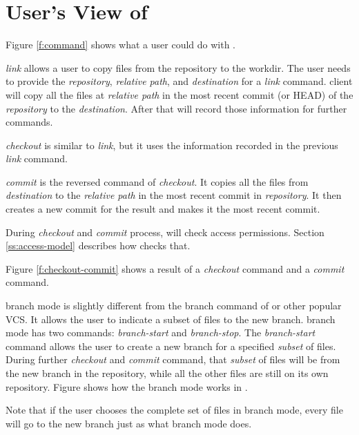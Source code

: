 \section{User's View of \Sys}
\label{userview}

\iffalse
    * Describe what action a user could make. Write a table for all the actions.
    * Describe the functionality for each important action which can not be
      described completely in the table.
    * Mention how each action is related to the FVM Daemon, if needed. (probably
      not needed)
\fi



Figure \ref{f:command} shows what a user could do with \sys.

\emph{link} allows a user to copy files from the repository to the workdir.
The user needs to provide the \emph{repository}, \emph{relative path}, and
\emph{destination} for a \emph{link} command. \Sys client will copy all the files
at \emph{relative path} in the most recent commit (or HEAD) of the
\emph{repository} to the \emph{destination}. After that \sys will record those
information for further commands.

\emph{checkout} is similar to \emph{link}, but it uses the information recorded
in the previous \emph{link} command.

\emph{commit} is the reversed command of \emph{checkout}. It
copies all the files from \emph{destination} to the \emph{relative path} in the
most recent commit in \emph{repository}. It then creates a new commit for the
result and makes it the most recent commit.

During \emph{checkout} and \emph{commit} process, \sys will check access
permissions. Section \ref{ss:access-model} describes how \sys checks that.



Figure \ref{f:checkout-commit} shows a result of a \emph{checkout} command and
a \emph{commit} command. 

\Sys branch mode is slightly different from the branch command of \git or other
popular VCS. It allows the user to indicate a subset of files to the new branch.
\Sys branch mode has two commands: \emph{branch-start} and \emph{branch-stop}.
The \emph{branch-start} command allows the user to create a new branch for a
specified \emph{subset} of files. During further \emph{checkout} and \emph{commit}
command, that \emph{subset} of files will be from the new branch in the
repository, while all the other files are still on its own repository. Figure
 shows how the branch mode works in \sys.

Note that if the user chooses the complete set of files in branch mode, every
file will go to the new branch just as what \git branch mode does.


